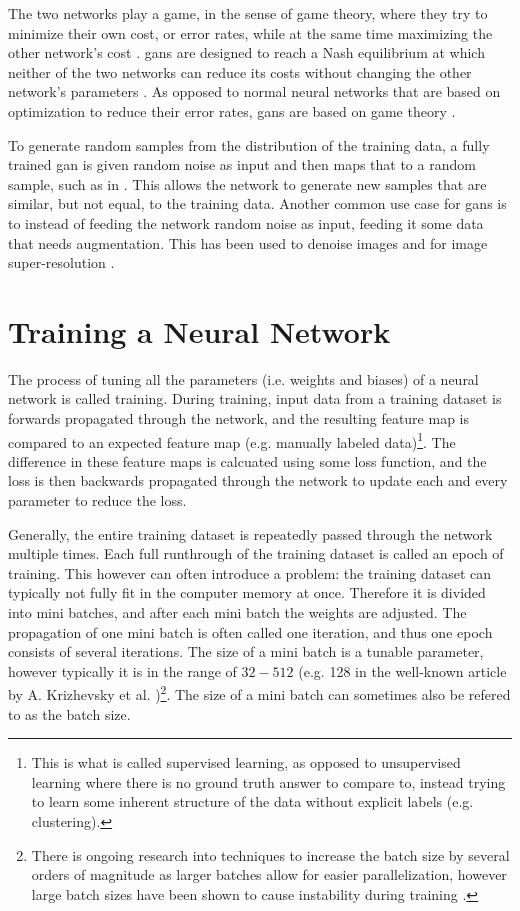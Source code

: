 The two networks play a game, in the sense of game theory, where they try to minimize their own cost, or error rates, while at the same time maximizing the other network's cost \cite{goodfellow2020gan}. \acrshort{gan}s are designed to reach a Nash equilibrium at which neither of the two networks can reduce its costs without changing the other network's parameters \cite{liu2020tomogan}. As opposed to normal neural networks that are based on optimization to reduce their error rates, \acrshort{gan}s are based on game theory \cite{goodfellow2020gan}. 

To generate random samples from the distribution of the training data, a fully trained \acrshort{gan} is given random noise as input and then maps that to a random sample, such as in \cite{zhangsagan}. This allows the network to generate new samples that are similar, but not equal, to the training data. Another common use case for \acrshort{gan}s is to instead of feeding the network random noise as input, feeding it some data that needs augmentation. This has been used to denoise images and for image super-resolution \cite{8710893,Ledig_2017_CVPR}. 


\section{Training a Neural Network}
The process of tuning all the parameters (i.e. weights and biases) of a neural network is called training. During training, input data from a training dataset is forwards propagated through the network, and the resulting feature map is compared to an expected feature map (e.g. manually labeled data)\footnote{This is what is called supervised learning, as opposed to unsupervised learning where there is no ground truth answer to compare to, instead trying to learn some inherent structure of the data without explicit labels (e.g. clustering). }. The difference in these feature maps is calcuated using some loss function, and the loss is then backwards propagated through the network to update each and every parameter to reduce the loss. 

Generally, the entire training dataset is repeatedly passed through the network multiple times. Each full runthrough of the training dataset is called an epoch of training. This however can often introduce a problem: the training dataset can typically not fully fit in the computer memory at once. Therefore it is divided into mini batches, and after each mini batch the weights are adjusted. The propagation of one mini batch is often called one iteration, and thus one epoch consists of several iterations. The size of a mini batch is a tunable parameter, however typically it is in the range of $32-512$ (e.g. 128 in the well-known article by A. Krizhevsky et al. \cite{alexnet})\footnote{There is ongoing research into techniques to increase the batch size by several orders of magnitude as larger batches allow for easier parallelization, however large batch sizes have been shown to cause instability during training \cite{you2017large}. }. The size of a mini batch can sometimes also be refered to as the batch size. 

